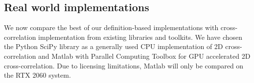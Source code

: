 \subsection{Real world implementations}

We now compare the best of our definition-based implementations with cross-correlation implementation from existing libraries and toolkits. We have chosen the Python SciPy library as a generally used CPU implementation of 2D cross-correlation and Matlab with Parallel Computing Toolbox for GPU accelerated 2D cross-correlation. Due to licensing limitations, Matlab will only be compared on the RTX 2060 system.

